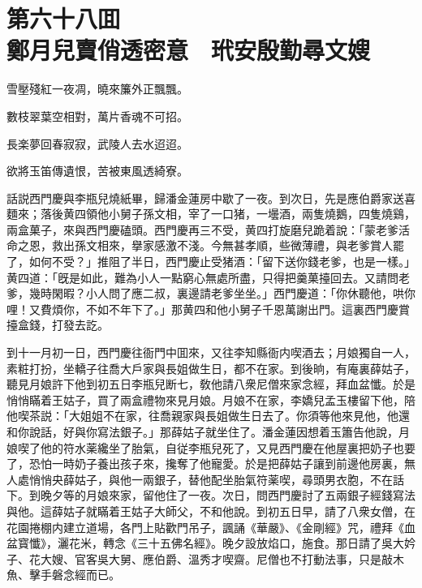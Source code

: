 
\chapter*{第六十八囬　\\鄭月兒賣俏透密意　玳安殷勤尋文嫂}


\begin{myquote}
雪壓殘紅一夜凋，曉來簾外正飄飄。

數枝翠葉空相對，萬片香魂不可招。

長楽夢回春寂寂，武陵人去水迢迢。

欲將玉笛傳遺恨，苦被東風透綺寮。
\end{myquote}

話説西門慶與李瓶兒燒紙畢，歸潘金蓮房中歇了一夜。到次日，先是應伯爵家送喜麵來；落後黄四領他小舅子孫文相，宰了一口猪，一壜酒，兩隻燒鵝，四隻燒鷄，兩盒菓子，來與西門慶磕頭。西門慶再三不受，黄四打旋磨兒跪着說：「蒙老爹活命之恩，救出孫文相來，擧家感激不淺。今無甚孝順，些微薄禮，與老爹賞人罷了，如何不受？」推阻了半日，西門慶止受猪酒：「留下送你錢老爹，也是一樣。」黄四道：「旣是如此，難為小人一點窮心無處所盡，只得把羹菓擡回去。又請問老爹，幾時閑暇？小人問了應二叔，裏邊請老爹坐坐。」西門慶道：「你休聽他，哄你哩！又費煩你，不如不年下了。」那黄四和他小舅子千恩萬謝出門。這裏西門慶賞擡盒錢，打發去訖。

到十一月初一日，西門慶往衙門中囬來，又往李知縣衙内喫酒去；月娘獨自一人，素粧打扮，坐轎子往喬大戶家與長姐做生日，都不在家。到後晌，有庵裏薛姑子，聽見月娘許下他到初五日李瓶兒断七，敎他請八衆尼僧來家念經，拜血盆懺。於是悄悄瞞着王姑子，買了兩盒禮物來見月娘。月娘不在家，李嬌兒孟玉樓留下他，陪他喫茶説：「大姐姐不在家，往喬親家與長姐做生日去了。你須等他來見他，他還和你說話，好與你寫法銀子。」那薛姑子就坐住了。潘金蓮因想着玉簫告他說，月娘喫了他的符水薬纔坐了胎氣，自従李瓶兒死了，又見西門慶在他屋裏把奶子也要了，恐怕一時奶子養出孩子來，攙奪了他寵愛。於是把薛姑子讓到前邊他房裏，無人處悄悄央薛姑子，與他一兩銀子，替他配坐胎氣符薬喫，尋頭男衣胞，不在話下。到晚夕等的月娘來家，留他住了一夜。次日，問西門慶討了五兩銀子經錢寫法與他。這薛姑子就瞞着王姑子大師父，不和他說。到初五日早，請了八衆女僧，在花園捲棚内建立道場，各門上貼歡門吊子，諷誦《華嚴》、《金剛經》咒，禮拜《血盆寳懺》，灑花米，轉念《三十五佛名經》。晚夕設放焰口，施食。那日請了吳大妗子、花大嫂、官客吳大舅、應伯爵、溫秀才喫齋。尼僧也不打動法事，只是敲木魚、擊手磐念經而已。

